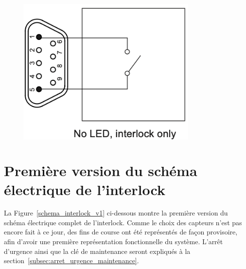 \begin{minipage}[c]{0.35\textwidth}
    \begin{figure}[H]
        \begin{center}
            \includegraphics[width=0.8\textwidth]{assets/figures/Protections_laser/Securite_electrique/interlock_only.png}
        \end{center}
        \label{Interlock_only}
    \end{figure}
\end{minipage}

\newpage
\section{Première version du schéma électrique de l'interlock}
La Figure~\ref{schema_interlock_v1} ci-dessous montre la première version du schéma électrique complet de l'interlock. Comme le choix des capteurs n'est pas encore fait à ce jour, des fins de course ont été représentés de façon provisoire, afin d'avoir une première représentation fonctionnelle du système. L'arrêt d'urgence ainsi que la clé de maintenance seront expliqués à la section~\ref{subsec:arret_urgence_maintenance}.

